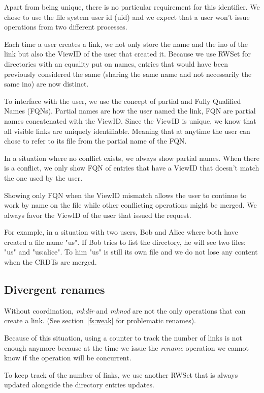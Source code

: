 \documentclass[sigconf,anonymous,10pt]{acmart}
\begin{document}
Apart from being unique, there is no particular requirement for this identifier.
We chose to use the file system user id (uid) and we expect that a
user won’t issue operations from two different processes.

Each time a user creates a link, we not only store the name and the ino
of the link but also the ViewID of the user that created it.
Because we use RWSet for directories with an equality put on names,
entries that would have been previously considered the same
(sharing the same name and not necessarily the same ino) are now distinct.

To interface with the user, we use the concept of partial and
Fully Qualified Names (FQNs).
Partial names are how the user named the link,
FQN are partial names concatenated with the ViewID.
Since the ViewID is unique, we know that all visible links are uniquely
identifiable. Meaning that at anytime the user can chose to refer to its file
from the partial name of the FQN.

In a situation where no conflict exists, we always show partial names.
When there is a conflict, we only show FQN of entries that have a ViewID that
doesn’t match the one used by the user.

Showing only FQN when the ViewID mismatch allows the user to continue to
work by name on the file while other conflicting operations might be merged.
We always favor the ViewID of the user that issued the request.

For example, in a situation with two users,
Bob and Alice where both have created a file name "us".
If Bob tries to list the directory, he will see two files: "us" and "us:alice".
To him "us" is still its own file and we do not lose any content when the CRDTs
are merged.

\subsection{Divergent renames}

Without coordination, \textit{mkdir} and \textit{mknod} are not the only
operations that can create a link. (See section~\ref{fs:weak} for problematic
renames).

Because of this situation, using a counter to track the number of links is not
enough anymore because at the time we issue the \textit{rename} operation
we cannot know if the operation will be concurrent.

To keep track of the number of links, we use another RWSet that is
always updated alongside the directory entries updates.
\end{document}
